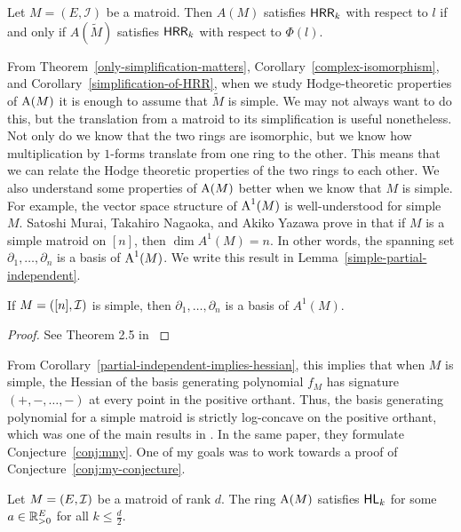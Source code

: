 \documentclass{puthesis-UG}
\begin{document}
\begin{cor} \label{simplification-of-HRR}
	Let $M = (E, \mathcal{I})$ be a matroid. Then $A(M)$ satisfies $\mathsf{HRR}_k$ with respect to $l$ if and only if $A(\widetilde{M})$ satisfies $\mathsf{HRR}_k$ with respect to $\Phi(l)$. 
\end{cor}

From Theorem~\ref{only-simplification-matters}, Corollary~\ref{complex-isomorphism}, and Corollary~\ref{simplification-of-HRR}, when we study Hodge-theoretic properties of $\operatorname{A}(M)$ it is enough to assume that $\widetilde{M}$ is simple. We may not always want to do this, but the translation from a matroid to its simplification is useful nonetheless. Not only do we know that the two rings are isomorphic, but we know how multiplication by $1$-forms translate from one ring to the other. This means that we can relate the Hodge theoretic properties of the two rings to each other. We also understand some properties of $\operatorname{A}(M)$ better when we know that $M$ is simple. For example, the vector space structure of $\operatorname{A}^1(M)$ is well-understood for simple $M$. Satoshi Murai, Takahiro Nagaoka, and Akiko Yazawa prove in \cite{MNY} that if $M$ is a simple matroid on $[n]$, then $\dim A^1(M) = n$. In other words, the spanning set $\partial_1, \ldots, \partial_n$ is a basis of $\operatorname{A}^1(M)$. We write this result in Lemma~\ref{simple-partial-independent}. 

\begin{lem} \label{simple-partial-independent}
	If $M = ([n], \mathcal{I})$ is simple, then $\partial_1, \ldots, \partial_n$ is a basis of $A^1(M)$.
\end{lem}

\begin{proof}
	See Theorem 2.5 in \cite{MNY}
\end{proof}	

From Corollary~\ref{partial-independent-implies-hessian}, this implies that when $M$ is simple, the Hessian of the basis generating polynomial $f_M$ has signature $(+,-, \ldots, -)$ at every point in the positive orthant. Thus, the basis generating polynomial for a simple matroid is strictly log-concave on the positive orthant, which was one of the main results in \cite{MNY}. In the same paper, they formulate Conjecture~\ref{conj:mny}. One of my goals was to work towards a proof of Conjecture~\ref{conj:my-conjecture}. 

\begin{conj} \label{conj:mny}
	Let $M = (E, \mathcal{I})$ be a matroid of rank $d$. The ring $\operatorname{A}(M)$ satisfies $\mathsf{HL}_k$ for some $a \in \mathbb{R}^E_{> 0}$ for all $k \leq \frac{d}{2}$.  
\end{conj}
\end{document}
